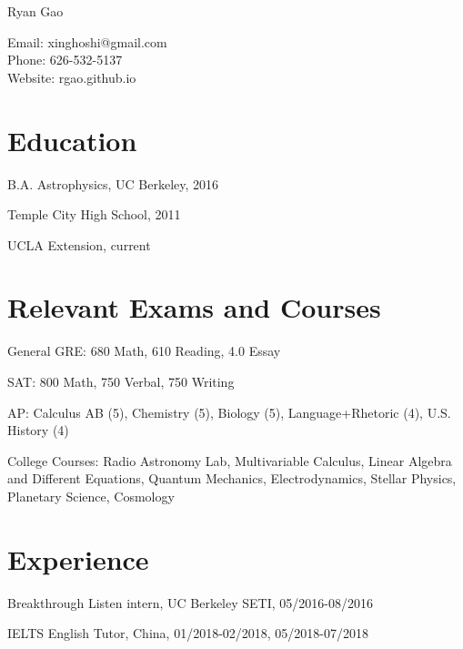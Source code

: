 \documentclass[letterpaper]{article}
\def\name{Ryan Gao}
\renewenvironment{itemize}{
  \begin{list}{}{
      \setlength{\leftmargin}{1.5em}
    }
}{
  \end{list}
}
\begin{document}
\centerline{\huge \name}

\vspace{0.25in}

\begin{center}
  \begin{minipage}{0.5\linewidth}
    \begin{center}
    Email: xinghoshi@gmail.com\\
    Phone: 626-532-5137\\
    Website: rgao.github.io
    \end{center}
\end{minipage}
\end{center}

\section*{Education}
\begin{itemize}
\item B.A. Astrophysics, UC Berkeley, 2016
\item Temple City High School, 2011
\item UCLA Extension, current
\end{itemize}

\section*{Relevant Exams and Courses}
\begin{itemize}
\item General GRE: 680 Math, 610 Reading, 4.0 Essay
\item SAT: 800 Math, 750 Verbal, 750 Writing
\item AP: Calculus AB (5), Chemistry (5), Biology (5), Language+Rhetoric (4), U.S. History (4)
\item College Courses: Radio Astronomy Lab, Multivariable Calculus, Linear Algebra and Different Equations, Quantum Mechanics, Electrodynamics, Stellar Physics, Planetary Science, Cosmology
\end{itemize}

\section*{Experience}
\begin{itemize}
\item Breakthrough Listen intern, UC Berkeley SETI, 05/2016-08/2016
\item IELTS English Tutor, China, 01/2018-02/2018, 05/2018-07/2018
\end{itemize}
\end{document}
